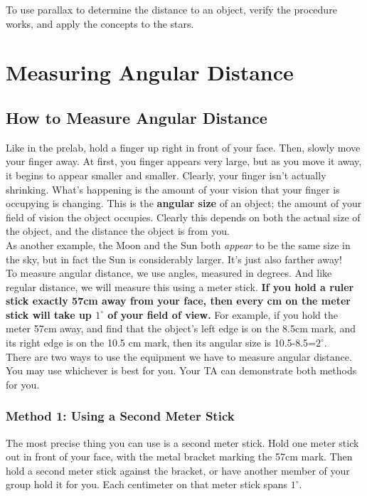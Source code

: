 \documentclass[11pt]{article}
\begin{document}
To use parallax to determine the distance to an object, verify the procedure works, and apply the concepts to the stars.

\newpage

\section{Measuring Angular Distance}

\subsection{How to Measure Angular Distance}
Like in the prelab, hold a finger up right in front of your face. Then, slowly move your finger away. At first, you finger appears very large, but as you move it away, it begins to appear smaller and smaller. Clearly, your finger isn't actually shrinking. What's happening is the amount of your vision that your finger is occupying is changing. This is the \textbf{angular size} of an object; the amount of your field of vision the object occupies. Clearly this depends on both the actual size of the object, and the distance the object is from you.\\

As another example, the Moon and the Sun both \textit{appear} to be the same size in the sky, but in fact the Sun is considerably larger. It's just also farther away!\\

To measure angular distance, we use angles, measured in degrees. And like regular distance, we will measure this using a meter stick. \textbf{If you hold a ruler stick exactly 57cm away from your face, then every cm on the meter stick will take up $1^\circ$ of your field of view.} For example, if you hold the meter 57cm away, and find that the object's left edge is on the 8.5cm mark, and its right edge is on the 10.5 cm mark, then its angular size is 10.5-8.5=$2^\circ$.\\

There are two ways to use the equipment we have to measure angular distance. You may use whichever is best for you. Your TA can demonstrate both methods for you.

\subsubsection{Method 1: Using a Second Meter Stick}

The most precise thing you can use is a second meter stick. Hold one meter stick out in front of your face, with the metal bracket marking the 57cm mark. Then hold a second meter stick against the bracket, or have another 
member of your group hold it for you. Each centimeter on that meter stick spans $1^\circ$.
\end{document}
